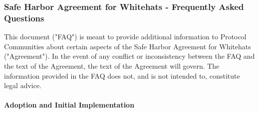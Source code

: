 \subsubsection*{Safe Harbor Agreement for Whitehats - Frequently Asked Questions}\label{exhibit:f:faq_title}

This document ("FAQ") is meant to provide additional information to Protocol Communities about certain aspects of the Safe Harbor Agreement for Whitehats ("Agreement"). In the event of any conflict or inconsistency between the FAQ and the text of the Agreement, the text of the Agreement will govern. The information provided in the FAQ does not, and is not intended to, constitute legal advice.

\paragraph{Adoption and Initial Implementation}\label{exhibit:f:adoption}

